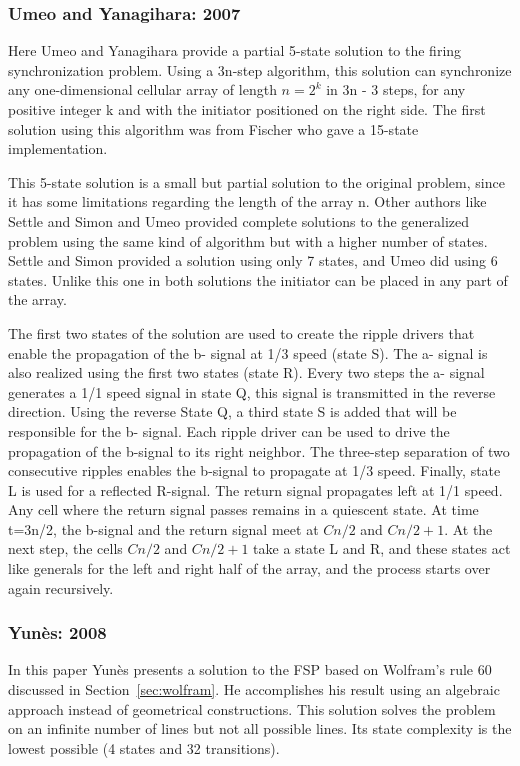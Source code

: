 \documentclass{article}
\begin{document}
\subsubsection{Umeo and Yanagihara: 2007}

Here Umeo and Yanagihara \cite{umeo2007smallest} provide a partial 5-state solution to the firing synchronization problem. Using a 3n-step algorithm, this solution can synchronize any one-dimensional cellular array of length $n=2^k$ in 3n - 3 steps, for any positive integer k and with the initiator positioned on the right side. The first solution using this algorithm was from Fischer\cite{Fischer:1965:GPO:321281.321290} who gave a 15-state implementation.

This 5-state solution is a small but partial solution to the original problem, since it has some limitations regarding the length of the array n. Other authors like Settle and Simon\cite{settle2002smaller} and Umeo\cite{umeo2006state} provided complete solutions to the generalized problem using the same kind of algorithm but with a higher number of states. Settle and Simon provided a solution using only 7 states\cite{settle2002smaller}, and Umeo did using 6 states\cite{umeo2006state}. Unlike this one in both solutions the initiator can be placed in any part of the array. 

The first two states of the solution are used to create the ripple drivers that enable the propagation of the b- signal at 1/3 speed (state S). The a- signal is also realized using the first two states (state R). Every two steps the a- signal generates a 1/1 speed signal in state Q, this signal is transmitted in the reverse direction.
Using the reverse State Q, a third state S is added that will be responsible for the b- signal. Each ripple driver can be used to drive the propagation of the b-signal to its right neighbor. The three-step separation of two consecutive ripples enables the b-signal to propagate at 1/3 speed. Finally, state L is used for a reflected R-signal. The return signal propagates left at 1/1 speed. Any cell where the return signal passes remains in a quiescent state. At time t=3n/2, the b-signal and the return signal meet at $Cn/2$ and $Cn/2+1$. At the next step, the cells $Cn/2$ and $Cn/2+1$ take a state L and R, and these states act like generals for the left and right half of the array, and the process starts over again recursively.

\subsubsection{Yun\`{e}s: 2008} \label{ssec:num1}
In this paper Yun\`{e}s\cite{yunes20084} presents a solution to the FSP based on Wolfram's rule 60 discussed in Section~\ref{sec:wolfram}. He accomplishes his result using an algebraic approach instead of geometrical constructions. This solution solves the problem on an infinite number of lines but not all possible lines. Its state complexity is the lowest possible (4 states and 32 transitions).
\end{document}
